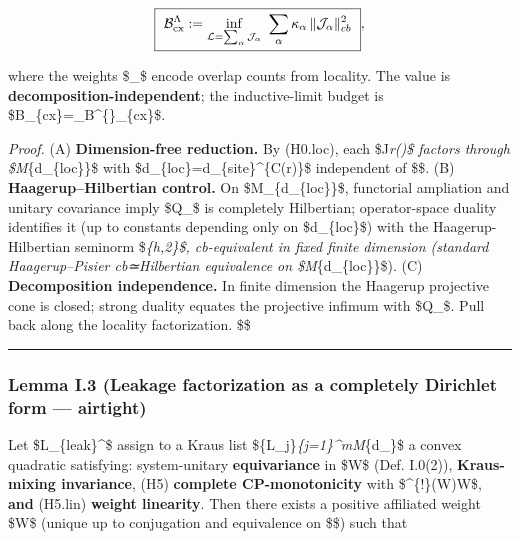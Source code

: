 \documentclass[
]{article}
\numberwithin{equation}{section}
\begin{document}
\[
\boxed{\ \mathcal B^{\Lambda}_{\rm cx}:=\inf_{\mathcal L=\sum_\alpha \mathcal J_\alpha}\ \sum_\alpha \kappa_\alpha\,\|\mathcal J_\alpha\|_{cb}^2\ },
\]

where the weights \$\kappa\_\alpha\$ encode overlap counts from
locality. The value is \textbf{decomposition-independent}; the
inductive-limit budget is
\$\mathcal B\_\{\rm cx\}=\sup\_\Lambda \mathcal B\^{}\{\Lambda\}\_\{\rm cx\}\$.

\emph{Proof.} (A) \textbf{Dimension-free reduction.} By (H0.loc), each
\$\mathcal J\in{}\emph{r(\Lambda)\$ factors through
\$M}\{d\_\{\rm loc\}\}\$ with
\$d\_\{\rm loc\}=d\_\{\rm site\}\^{}\{C(r)\}\$ independent of
\$\Lambda\$. (B) \textbf{Haagerup--Hilbertian control.} On
\$M\_\{d\_\{\rm loc\}\}\$, functorial ampliation and unitary covariance
imply \$Q\_\Lambda\$ is completely Hilbertian; operator-space duality
identifies it (up to constants depending only on \$d\_\{\rm loc\}\$)
with the Haagerup-Hilbertian seminorm
\$\textbar{}\cdot\textbar{}\emph{\{h,2\}\$, cb-equivalent in fixed
finite dimension (standard Haagerup--Pisier cb≃Hilbertian equivalence on
\$M}\{d\_\{\rm loc\}\}\$). (C) \textbf{Decomposition independence.} In
finite dimension the Haagerup projective cone is closed; strong duality
equates the projective infimum with \$Q\_\Lambda\$. Pull back along the
locality factorization. \$\square\$

\begin{center}\rule{0.5\linewidth}{0.5pt}\end{center}

\hypertarget{lemma-i.3-leakage-factorization-as-a-completely-dirichlet-form-airtight}{%
\subsubsection{Lemma I.3 (Leakage factorization as a completely
Dirichlet form ---
airtight)}\label{lemma-i.3-leakage-factorization-as-a-completely-dirichlet-form-airtight}}

Let \$\mathcal L\_\{\rm leak\}\^{}\Lambda\$ assign to a Kraus list
\$\{L\_j\}\emph{\{j=1\}\^{}m\subset M}\{d\_\Lambda\}\$ a convex
quadratic satisfying: system-unitary \textbf{equivariance} in \$W\$
(Def. I.0(2)), \textbf{Kraus-mixing invariance}, (H5) \textbf{complete
CP-monotonicity} with \$\Phi\^{}\{!\}(W)\le W\$, \textbf{and} (H5.lin)
\textbf{weight linearity}. Then there exists a positive affiliated
weight \$W\$ (unique up to conjugation and equivalence on
\$\$) such that
\end{document}
